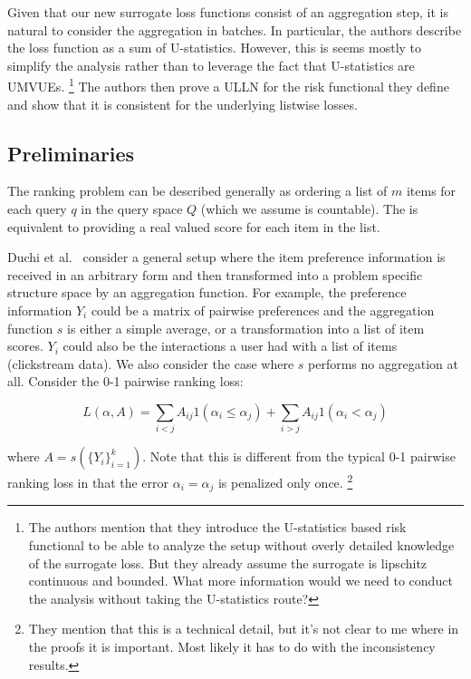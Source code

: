 \documentclass[a4paper,10pt]{article}
\begin{document}
Given that our new surrogate loss functions consist of an aggregation
step, it is natural to consider the aggregation in batches. In
particular, the authors describe the loss function as a sum of
U-statistics. However, this is seems mostly to simplify the analysis
rather than to leverage the fact that U-statistics are UMVUEs.
\footnote{The authors mention that they introduce the U-statistics
  based risk functional to be able to analyze the setup without overly
  detailed knowledge of the surrogate loss. But they already assume
  the surrogate is lipschitz continuous and bounded. What more
  information would we need to conduct the analysis without taking the
  U-statistics route?}
The authors then prove a ULLN for the risk
functional they define and show that it is consistent for the
underlying listwise losses.

\subsection{Preliminaries}

The ranking problem can be described generally as ordering a list of
\(m\) items for each query \(q\) in the query space \(Q\) (which we
assume is countable). The is equivalent to providing a real valued
score for each item in the list.

Duchi et al.~\cite{duchi-2013-ranking} consider a general setup where
the item preference information is received in an arbitrary form and
then transformed into a problem specific structure space by an
aggregation function. For example, the preference information $Y_i$
could be a matrix of pairwise preferences and the aggregation function
$s$ is either a simple average, or a transformation into a list of
item scores. $Y_i$ could also be the interactions a user had with a
list of items (clickstream data). We also consider the case where $s$ performs no
aggregation at all. Consider the 0-1 pairwise ranking loss:

\begin{equation}\label{eq:general-loss}
  L(\alpha, A) = \sum_{i<j} A_{ij}1(\alpha_i \leq \alpha_j) + \sum_{i>j} A_{ij}1(\alpha_i < \alpha_j)
\end{equation}

where $A = s(\{Y_i\}_{i=1}^k)$. Note that this is different from the typical 0-1 pairwise ranking loss in that the error \(\alpha_i = \alpha_j\) is penalized only once.
\footnote{They mention that this is a technical detail, but it's not clear to me where in the proofs it is important. Most likely it has to do with the inconsistency results.}
\end{document}
